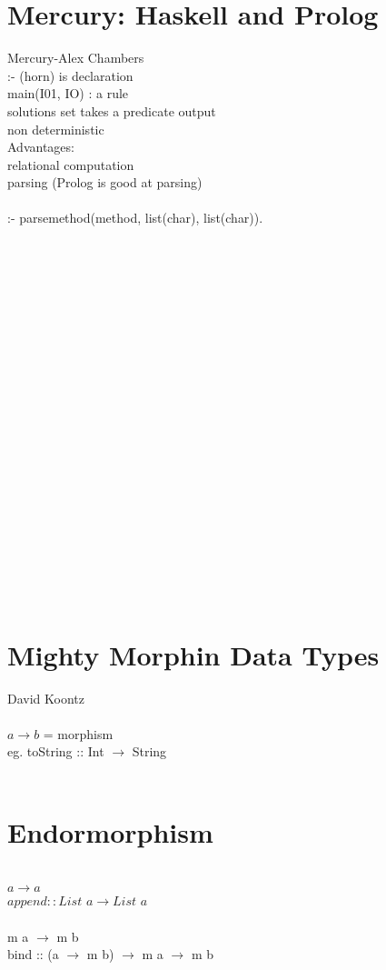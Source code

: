 \documentclass{article}
\begin{document}
\section{Mercury: Haskell and Prolog}
Mercury-Alex Chambers
\\
:- (horn) is declaration
\\
main(I01, IO) : a rule
\\
solutions set takes a predicate output 
\\
non deterministic
\\
Advantages:
\\
relational computation
\\
parsing (Prolog is good at parsing)
\\
\\
:- parsemethod(method, list(char), list(char)).
\\
\\
\\
\\
\\
\\
\\
\\
\\
\\
\\
\\
\\
\\
\\
\\
\\
\\
\\
\\
\\
\\
\section{Mighty Morphin Data Types}
David Koontz
\\
\\
$a \rightarrow b$  = morphism
\\
eg. toString :: Int $\rightarrow$ String
\\
\\
\section{Endormorphism}
\\
$a \rightarrow a$
\\
$append :: List$ $a \rightarrow List$  $a$
\\
\\
m a $\rightarrow$ m b
\\
bind :: (a $\rightarrow$ m b) $\rightarrow$ m a $\rightarrow$ m b
\\
\\
\end{document}
